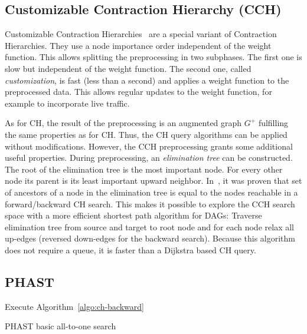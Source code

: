 \documentclass[a4paper,UKenglish,cleveref, autoref, thm-restate]{lipics-v2021}
\begin{document}
\subsection{Customizable Contraction Hierarchy (CCH)}

Customizable Contraction Hierarchies~\cite{dsw-cch-15} are a special variant of Contraction Hierarchies.
They use a node importance order independent of the weight function.
This allows splitting the preprocessing in two subphases.
The first one is slow but independent of the weight function.
The second one, called \emph{customization}, is fast (less than a second) and applies a weight function to the preprocessed data.
This allows regular updates to the weight function, for example to incorporate live traffic.

As for CH, the result of the preprocessing is an augmented graph $G^+$ fulfilling the same properties as for CH.
Thus, the CH query algorithms can be applied without modifications.
However, the CCH preprocessing grants some additional useful properties.
During preprocessing, an \emph{elimination tree} can be constructed.
The root of the elimination tree is the most important node.
For every other node its parent is its least important upward neighbor.
In~\cite{bcrw-s-16}, it was proven that set of ancestors of a node in the elimination tree is equal to the nodes reachable in a forward/backward CH search.
This makes it possible to explore the CCH search space with a more efficient shortest path algorithm for DAGs:
Traverse elimination tree from source and target to root node and for each node relax all up-edges (reversed down-edges for the backward search).
Because this algorithm does not require a queue, it is faster than a Dijkstra based CH query.

\subsection{PHAST}

\begin{algorithm2e}
Execute Algorithm~\ref{algo:ch-backward}\;
\caption{PHAST basic all-to-one search}
\label{algo:phast}
\end{algorithm2e}
\end{document}
